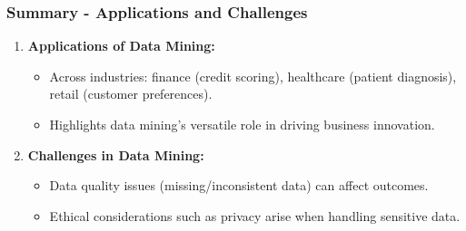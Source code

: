 \documentclass[aspectratio=169]{beamer}
\begin{document}
\begin{frame}[fragile]
    \frametitle{Summary - Applications and Challenges}
    \begin{enumerate}
        \item \textbf{Applications of Data Mining:}
        \begin{itemize}
            \item Across industries: finance (credit scoring), healthcare (patient diagnosis), retail (customer preferences).
            \item Highlights data mining’s versatile role in driving business innovation.
        \end{itemize}
        
        \item \textbf{Challenges in Data Mining:}
        \begin{itemize}
            \item Data quality issues (missing/inconsistent data) can affect outcomes.
            \item Ethical considerations such as privacy arise when handling sensitive data.
        \end{itemize}
    \end{enumerate}
\end{frame}
\end{document}
